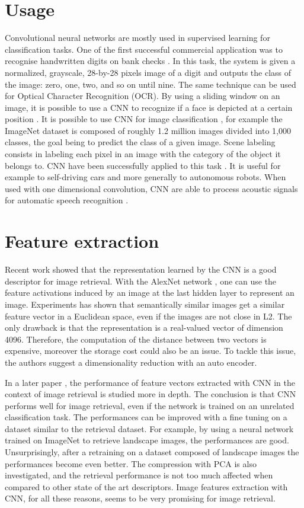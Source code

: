 \section{Usage}
Convolutional neural networks are mostly used in supervised learning for classification tasks. One of the first successful commercial application was to recognise handwritten digits on bank checks \cite{lecun1998gradient}. In this task, the system is given a normalized, grayscale, 28-by-28 pixels image of a digit and outputs the class of the image: zero, one, two, and so on until nine. The same technique can be used for Optical Character Recognition (OCR). By using a sliding window on an image, it is possible to use a CNN to recognize if a face is depicted at a certain position \cite{garcia2004convolutional}. It is possible to use CNN for image classification \cite{krizhevsky2012imagenet}, for example the ImageNet dataset is composed of roughly 1.2 million images divided into 1,000 classes, the goal being to predict the class of a given image. Scene labeling consists in labeling each pixel in an image with the category of the object it belongs to. CNN have been successfully applied to this task \cite{farabet2013learning}. It is useful for example to self-driving cars and more generally to autonomous robots. When used with one dimensional convolution, CNN are able to process acoustic signals for automatic speech recognition \cite{sercu2015verydeep}.

\section{Feature extraction}
Recent work showed that the representation learned by the CNN is a good descriptor for image retrieval. With the AlexNet network \cite{krizhevsky2012imagenet}, one can use the feature activations induced by an image at the last hidden layer to represent an image. Experiments has shown that semantically similar images get a similar feature vector in a Euclidean space, even if the images are not close in L2. The only drawback is that the representation is a real-valued vector of dimension 4096. Therefore, the computation of the distance between two vectors is expensive, moreover the storage cost could also be an issue. To tackle this issue, the authors suggest a dimensionality reduction with an auto encoder.

In a later paper \cite{babenko2014neural}, the performance of feature vectors extracted with CNN in the context of image retrieval is studied more in depth. The conclusion is that CNN performs well for image retrieval, even if the network is trained on an unrelated classification task. The performances can be improved with a fine tuning on a dataset similar to the retrieval dataset. For example, by using a neural network trained on ImageNet to retrieve landscape images, the performances are good. Unsurprisingly, after a retraining on a dataset composed of landscape images the performances become even better. The compression with PCA is also investigated, and the retrieval performance is not too much affected when compared to other state of the art descriptors. Image features extraction with CNN, for all these reasons, seems to be very promising for image retrieval.

